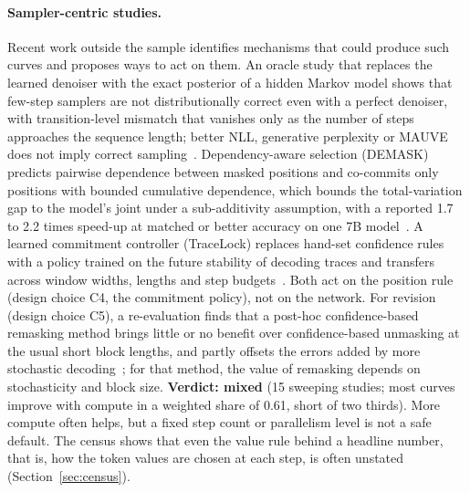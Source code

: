 \paragraph{Sampler-centric studies.} Recent work outside the sample identifies mechanisms that could produce such curves and proposes ways to act on them. An oracle study that replaces the learned denoiser with the exact posterior of a hidden Markov model shows that few-step samplers are not distributionally correct even with a perfect denoiser, with transition-level mismatch that vanishes only as the number of steps approaches the sequence length; better NLL, generative perplexity or MAUVE does not imply correct sampling~\cite{arXiv:2602.19619}. Dependency-aware selection (DEMASK) predicts pairwise dependence between masked positions and co-commits only positions with bounded cumulative dependence, which bounds the total-variation gap to the model's joint under a sub-additivity assumption, with a reported 1.7 to 2.2 times speed-up at matched or better accuracy on one 7B model~\cite{arXiv:2604.02560}. A learned commitment controller (TraceLock) replaces hand-set confidence rules with a policy trained on the future stability of decoding traces and transfers across window widths, lengths and step budgets~\cite{arXiv:2605.24697}. Both act on the position rule (design choice C4, the commitment policy), not on the network. For revision (design choice C5), a re-evaluation finds that a post-hoc confidence-based remasking method brings little or no benefit over confidence-based unmasking at the usual short block lengths, and partly offsets the errors added by more stochastic decoding~\cite{arXiv:2606.12232}; for that method, the value of remasking depends on stochasticity and block size.
\textbf{Verdict: mixed} (15 sweeping studies; most curves improve with compute in a weighted share of 0.61, short of two thirds). More compute often helps, but a fixed step count or parallelism level is not a safe default. The census shows that even the value rule behind a headline number, that is, how the token values are chosen at each step, is often unstated (Section~\ref{sec:census}).

